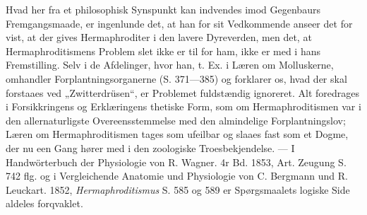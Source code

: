 \documentclass[12pt,a4paper]{book}
\begin{document}
{Hvad her fra et philosophisk Synspunkt kan indvendes imod Gegenbaurs
Fremgangsmaade, er ingenlunde det, at han for sit Vedkommende anseer det
for vist, at der gives Hermaphroditer i den lavere Dyreverden, men det,
at Hermaphroditismens Problem slet ikke er til for ham, ikke er med i
hans Fremstilling. Selv i de Afdelinger, hvor han, t. Ex. i Læren om
Molluskerne, omhandler Forplantningsorganerne (S. 371---385) og forklarer
os, hvad der skal forstaaes ved „Zwitterdrüsen“, er Problemet
fuldstændig ignoreret. Alt foredrages i Forsikkringens og Erklæringens
thetiske Form, som om Hermaphroditismen var i den allernaturligste
Overeensstemmelse med den almindelige Forplantningslov; Læren om
Hermaphroditismen tages som ufeilbar og slaaes fast som et Dogme, der nu
een Gang hører med i den zoologiske Troesbekjendelse. --- I
Handwörterbuch der Physiologie von R. Wagner. 4r Bd. 1853, Art. Zeugung
S. 742 flg. og i Vergleichende Anatomie und Physiologie von C. Bergmann
und R. Leuckart. 1852, \emph{Hermaphroditismus} S. 585 og 589 er
Spørgsmaalets logiske Side aldeles forqvaklet.}
\end{document}

